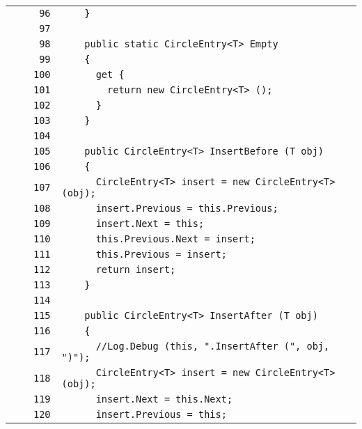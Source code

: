\documentclass[a4paper,10pt]{article}
\begin{document}
\begin{longtable}[l]{lrrl}
\cellcolor{gray} &  & \verb~96~ & \verb~    }~\\
\cellcolor{gray} &  & \verb~97~ & \verb~~\\
\cellcolor{gray} &  & \verb~98~ & \verb~    public static CircleEntry<T> Empty~\\
\cellcolor{gray} &  & \verb~99~ & \verb~    {~\\
\cellcolor{gray} &  & \verb~100~ & \verb~      get {~\\
\cellcolor{gray} &  & \verb~101~ & \verb~        return new CircleEntry<T> ();~\\
\cellcolor{gray} &  & \verb~102~ & \verb~      }~\\
\cellcolor{gray} &  & \verb~103~ & \verb~    }~\\
\cellcolor{gray} &  & \verb~104~ & \verb~~\\
\cellcolor{gray} &  & \verb~105~ & \verb~    public CircleEntry<T> InsertBefore (T obj)~\\
\cellcolor{gray} &  & \verb~106~ & \verb~    {~\\
\cellcolor{gray} &  & \verb~107~ & \verb~      CircleEntry<T> insert = new CircleEntry<T> (obj);~\\
\cellcolor{gray} &  & \verb~108~ & \verb~      insert.Previous = this.Previous;~\\
\cellcolor{gray} &  & \verb~109~ & \verb~      insert.Next = this;~\\
\cellcolor{gray} &  & \verb~110~ & \verb~      this.Previous.Next = insert;~\\
\cellcolor{gray} &  & \verb~111~ & \verb~      this.Previous = insert;~\\
\cellcolor{gray} &  & \verb~112~ & \verb~      return insert;~\\
\cellcolor{gray} &  & \verb~113~ & \verb~    }~\\
\cellcolor{gray} &  & \verb~114~ & \verb~~\\
\cellcolor{gray} &  & \verb~115~ & \verb~    public CircleEntry<T> InsertAfter (T obj)~\\
\cellcolor{gray} &  & \verb~116~ & \verb~    {~\\
\cellcolor{gray} &  & \verb~117~ & \verb~      //Log.Debug (this, ".InsertAfter (", obj, ")");~\\
\cellcolor{gray} &  & \verb~118~ & \verb~      CircleEntry<T> insert = new CircleEntry<T> (obj);~\\
\cellcolor{gray} &  & \verb~119~ & \verb~      insert.Next = this.Next;~\\
\cellcolor{gray} &  & \verb~120~ & \verb~      insert.Previous = this;~\\

\end{longtable}
\end{document}
